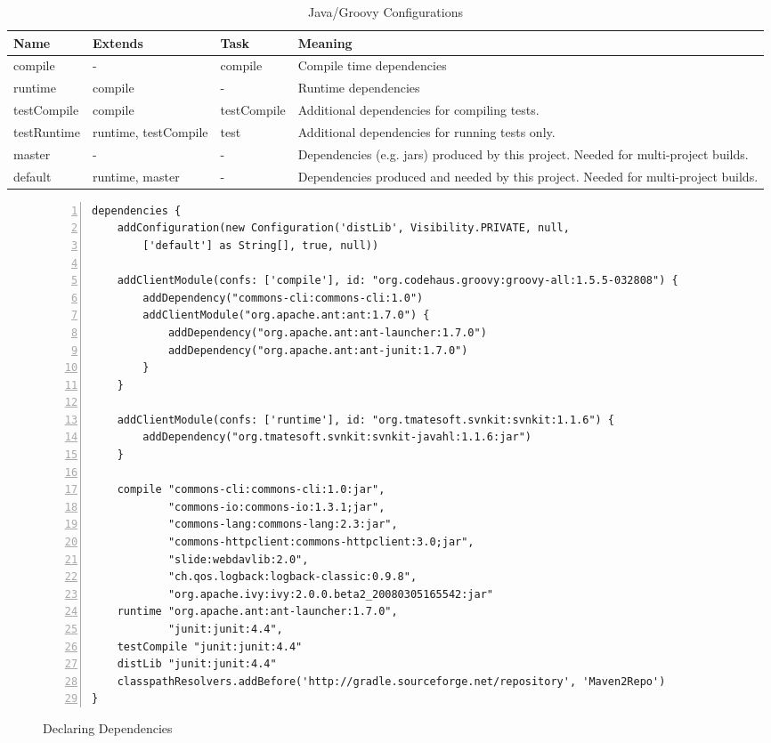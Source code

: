 

\begin{table}	
	\begin{tabularx}{\textwidth}{|l|l|l|X|} \hline
	\textbf{Name} & \textbf{Extends} & \textbf{Task} & \textbf{Meaning} \\ \hline
	compile & - & compile & Compile time dependencies\\ \hline
	runtime & compile & - & Runtime dependencies \\ \hline
	testCompile & compile & testCompile & Additional dependencies for compiling tests. \\ \hline
	testRuntime & runtime, testCompile & test & Additional dependencies for running tests only. \\ \hline
	master & - & - & Dependencies (e.g. jars) produced by this project. Needed for multi-project builds. \\ \hline
	default & runtime, master & - & Dependencies produced and needed by this project. Needed for multi-project builds. \\  \hline
	\end{tabularx}
	\caption{Java/Groovy Configurations}
	\label{tab:configurations}
\end{table}	

\begin{figure}
\caption{Declaring Dependencies}
\label{fig:dependencies}
\begin{Verbatim}[frame=single, framesep=1mm, numbers=left]
dependencies {
    addConfiguration(new Configuration('distLib', Visibility.PRIVATE, null, 
		['default'] as String[], true, null))

    addClientModule(confs: ['compile'], id: "org.codehaus.groovy:groovy-all:1.5.5-032808") {
        addDependency("commons-cli:commons-cli:1.0")
        addClientModule("org.apache.ant:ant:1.7.0") {
            addDependency("org.apache.ant:ant-launcher:1.7.0")
            addDependency("org.apache.ant:ant-junit:1.7.0")
        }
    }

    addClientModule(confs: ['runtime'], id: "org.tmatesoft.svnkit:svnkit:1.1.6") {
        addDependency("org.tmatesoft.svnkit:svnkit-javahl:1.1.6:jar")
    }

    compile "commons-cli:commons-cli:1.0:jar",
            "commons-io:commons-io:1.3.1;jar",
            "commons-lang:commons-lang:2.3:jar",
            "commons-httpclient:commons-httpclient:3.0;jar",
            "slide:webdavlib:2.0",
            "ch.qos.logback:logback-classic:0.9.8",
            "org.apache.ivy:ivy:2.0.0.beta2_20080305165542:jar"
    runtime "org.apache.ant:ant-launcher:1.7.0",
            "junit:junit:4.4",
    testCompile "junit:junit:4.4"
    distLib "junit:junit:4.4"
    classpathResolvers.addBefore('http://gradle.sourceforge.net/repository', 'Maven2Repo')
}	
\end{Verbatim}
\end{figure}

